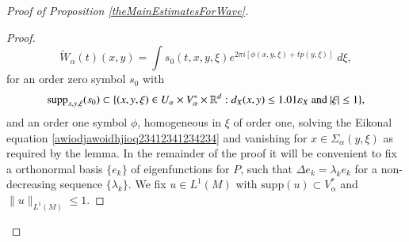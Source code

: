 \begin{proof}[Proof of Proposition \ref{theMainEstimatesForWave}]
\begin{proof}
    \begin{equation}
        \tilde{W}_\alpha(t)(x,y) = \int s_0(t,x,y,\xi) e^{2 \pi i [ \phi(x,y,\xi) + t p(y,\xi) ]}\; d\xi,
    \end{equation}
    for an order zero symbol $s_0$ with
    \begin{equation}
        \text{supp}_{x,y,\xi}(s_0) \subset \{ (x,y,\xi) \in U_\alpha \times V_\alpha^* \times \operatorname{\mathbb{R}}^d : d_X(x,y) \leq 1.01\varepsilon_X\ \text{and}\ |\xi| \leq 1 \},
    \end{equation}
    and an order one symbol $\phi$, homogeneous in $\xi$ of order one, solving the Eikonal equation \eqref{awiodjawoidhjioq23412341234234} and vanishing for $x \in \Sigma_\alpha(y,\xi)$ as required by the lemma. In the remainder of the proof it will be convenient to fix a orthonormal basis $\{ e_k \}$ of eigenfunctions for $P$, such that $\Delta e_k = \lambda_k e_k$ for a non-decreasing sequence $\{ \lambda_k \}$. We fix $u \in L^1(M)$ with $\text{supp}(u) \subset V_\alpha^*$ and $\| u \|_{L^1(M)} \leq 1$.


\end{proof}
\end{proof}
